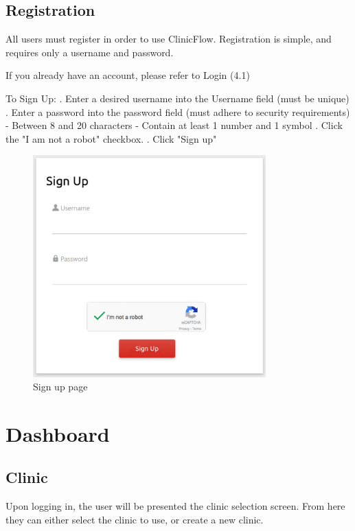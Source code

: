 \documentclass[12pt]{article}
\begin{document}
\subsection{Registration}
All users must register in order to use ClinicFlow. Registration is simple, and requires only a username and password.
\medbreak

If you already have an account, please refer to Login (4.1)
\medbreak

To Sign Up:
. Enter a desired username into the Username field (must be unique)
. Enter a password into the password field (must adhere to security requirements)
\medbreak
- Between 8 and 20 characters
\medbreak
- Contain at least 1 number and 1 symbol
. Click the "I am not a robot" checkbox.
. Click "Sign up"

\begin{figure}[h]
\caption{Sign up page}
\centering
\includegraphics[width=0.8\textwidth]{signup}
\end{figure}

\section{Dashboard}
\subsection{Clinic}
Upon logging in, the user will be presented the clinic selection screen. From here they can either select the clinic to use, or create a new clinic.
\medbreak
\end{document}
